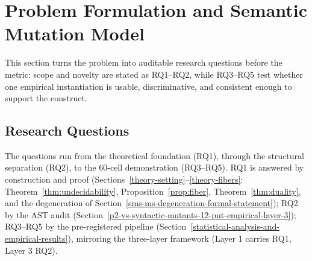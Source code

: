 \documentclass[manuscript,screen,review]{acmart}
\begin{document}
\section{Problem Formulation and Semantic Mutation Model}\label{research-questions-and-hypotheses}

This section turns the problem into auditable research questions before the
metric: scope and novelty are stated as RQ1--RQ2, while RQ3--RQ5 test whether one
empirical instantiation is usable, discriminative, and consistent enough to
support the construct.

\subsection{Research Questions}\label{research-questions}

The questions run from the theoretical foundation (RQ1), through the structural
separation (RQ2), to the 60-cell demonstration (RQ3--RQ5). RQ1 is answered by
construction and proof (Sections~\ref{theory-setting}--\ref{theory-fibers}:
Theorem~\ref{thm:undecidability}, Proposition~\ref{prop:fiber},
Theorem~\ref{thm:duality}, and the degeneration of
Section~\ref{sms-ms-degeneration-formal-statement}); RQ2 by the AST audit
(Section~\ref{p2-vs-syntactic-mutants-12-put-empirical-layer-3}); RQ3--RQ5 by the
pre-registered pipeline (Section~\ref{statistical-analysis-and-empirical-results}),
mirroring the three-layer framework (Layer 1 carries RQ1, Layer 3 RQ2).
\end{document}
